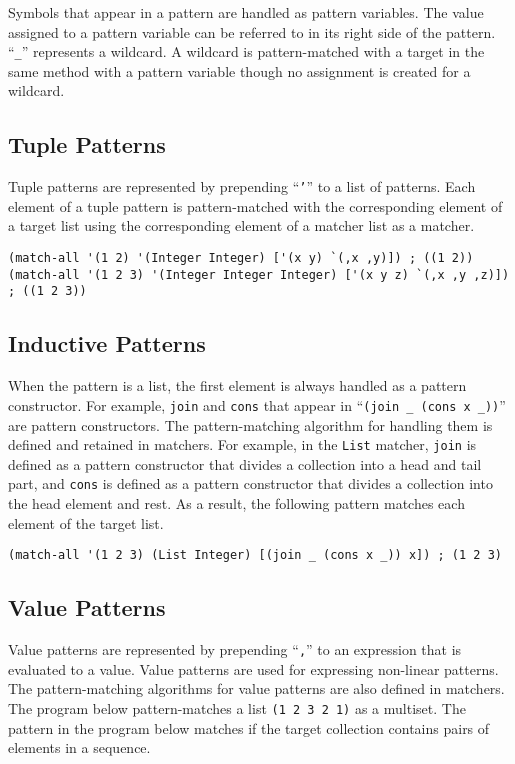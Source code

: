 \documentclass[acmlarge]{acmart}
\begin{document}
Symbols that appear in a pattern are handled as pattern variables.
The value assigned to a pattern variable can be referred to in its right side of the pattern.
``\verb|_|'' represents a wildcard.
A wildcard is pattern-matched with a target in the same method with a pattern variable though no assignment is created for a wildcard.

\subsection{Tuple Patterns}

Tuple patterns are represented by prepending ``\texttt{'}'' to a list of patterns.
Each element of a tuple pattern is pattern-matched with the corresponding element of a target list using the corresponding element of a matcher list as a matcher.

\begin{lstlisting}[language=egison]
(match-all '(1 2) '(Integer Integer) ['(x y) `(,x ,y)]) ; ((1 2))
(match-all '(1 2 3) '(Integer Integer Integer) ['(x y z) `(,x ,y ,z)]) ; ((1 2 3))
\end{lstlisting}

\subsection{Inductive Patterns}

When the pattern is a list, the first element is always handled as a pattern constructor.
For example, \texttt{join} and \texttt{cons} that appear in ``\verb|(join _ (cons x _))|'' are pattern constructors.
The pattern-matching algorithm for handling them is defined and retained in matchers.
For example, in the \texttt{List} matcher, \texttt{join} is defined as a pattern constructor that divides a collection into a head and tail part, and \texttt{cons} is defined as a pattern constructor that divides a collection into the head element and rest.
As a result, the following pattern matches each element of the target list.

\begin{lstlisting}[language=egison]
(match-all '(1 2 3) (List Integer) [(join _ (cons x _)) x]) ; (1 2 3)
\end{lstlisting}

\subsection{Value Patterns}

Value patterns are represented by prepending ``\texttt{,}'' to an expression that is evaluated to a value.
Value patterns are used for expressing non-linear patterns.
The pattern-matching algorithms for value patterns are also defined in matchers.
The program below pattern-matches a list \texttt{(1 2 3 2 1)} as a multiset.
The pattern in the program below matches if the target collection contains pairs of elements in a sequence.
\end{document}
